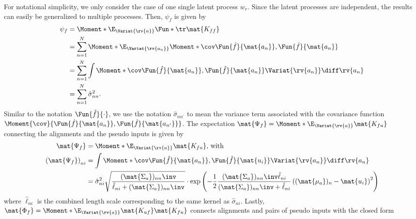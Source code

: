 \documentclass{article}
\begin{document}
For notational simplicity, we only consider the case of one single latent process $w_r$.
Since the latent processes are independent, the results can easily be generalized to multiple processes.
Then, $\psi_f$ is given by
\begin{align}
\begin{split}
    \psi_f &= \Moment*{\E_{\Variat{\rv{a}}}}{\Fun*{\tr}{\mat{K_{ff}}}} \\
    &= \sum_{n=1}^N \Moment*{\E_{\Variat{\rv{a_n}}}}{\Moment*{\cov}{\Fun{\hat{f}}{\mat{a_n}}, \Fun{\hat{f}}{\mat{a_n}}}} \\
    &= \sum_{n=1}^N \int \Moment*{\cov}{\Fun{\hat{f}}{\mat{a_n}}, \Fun{\hat{f}}{\mat{a_n}}} \Variat{\rv{a_n}} \diff \rv{a_n} \\
    &= \sum_{n=1}^N \hat{\sigma}_{nn}^2.
\end{split}
\end{align}
Similar to the notation $\Fun{\hat{f}}{\cdot}$, we use the notation $\hat{\sigma}_{nn^\prime}$ to mean the variance term associated with the covariance function $\Moment{\cov}{\Fun{\hat{f}}{\mat{a_n}}, \Fun{\hat{f}}{\mat{a_{n^\prime}}}}$.
The expectation $\mat{\Psi_f} = \Moment*{\E_{\Variat{\rv{a}}}}{\mat{K_{fu}}}$ connecting the alignments and the pseudo inputs is given by
\begin{align}
\begin{split}
    \mat{\Psi_f} &= \Moment*{\E_{\Variat{\rv{a}}}}{\mat{K_{fu}}}\text{, with} \\
    \left( \mat{\Psi_f} \right)_{ni}
    &= \int \Moment*{\cov}{\Fun{\hat{f}}{\mat{a_n}}, \Fun{\hat{f}}{\mat{u_i}}} \Variat{\rv{a_n}} \diff \rv{a_n} \\
    &= \hat{\sigma}_{ni}^2 \sqrt{\frac{(\mat{\Sigma_a})_{nn}\inv}{\hat{\ell}_{ni} + (\mat{\Sigma_a})_{nn}\inv}}
    \cdot \exp\left(-\frac{1}{2} \frac{(\mat{\Sigma_a})_{nn}\inv\hat{\ell}_{ni}}{(\mat{\Sigma_a})_{nn}\inv + \hat{\ell}_{ni}} \left((\mat{\mu_a})_n - \mat{u_i}\right)^2\right)
\end{split}
\end{align}
where $\hat{\ell}_{ni}$ is the combined length scale corresponding to the same kernel as $\hat{\sigma}_{ni}$.
Lastly, $\mat{\Phi_f} = \Moment*{\E_{\Variat{\rv{a}}}}{\mat{K_{uf}}\mat{K_{fu}}}$ connects alignments and pairs of pseudo inputs with the closed form
\end{document}

